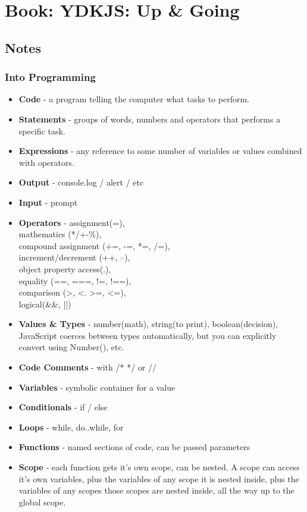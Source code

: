 \twocolumn
\chapter{Book: YDKJS: Up \& Going}
\section{Notes}
\subsection{Into Programming}
\begin{itemize}
\item \textbf{Code} - a program telling the computer what tasks to perform.
\item \textbf{Statements} - groups of words, numbers and operators that performs a specific task.
\item \textbf{Expressions} - any reference to some number of variables or values combined with operators.
\item \textbf{Output} - console.log / alert / etc
\item \textbf{Input} - prompt
\item \textbf{Operators} - assignment(=),\\ mathematics (*/+-\%),\\ compound assignment (+=, -=, *=, /=),\\ increment/decrement (++, --), \\object property access(.), \\equality (==, ===, !=, !==), \\comparison (>, <. >=, <=), \\logical(\&\&, ||)
\item \textbf{Values \& Types} - number(math), string(to print), boolean(decision), JavaScript coerces between types automatically, but you can explicitly convert using Number(), etc.
\item \textbf{Code Comments} - with /* */ or //
\item \textbf{Variables} - symbolic container for a value
\item \textbf{Conditionals} - if / else
\item \textbf{Loops} - while, do..while, for
\item \textbf{Functions} - named sections of code, can be passed parameters
\item \textbf{Scope} - each function gets it's own scope, can be nested. A scope can access it's own variables, plus the variables of any scope it is nested inside, plus the variables of any scopes those scopes are nested inside, all the way up to the global scope.
\end{itemize}
